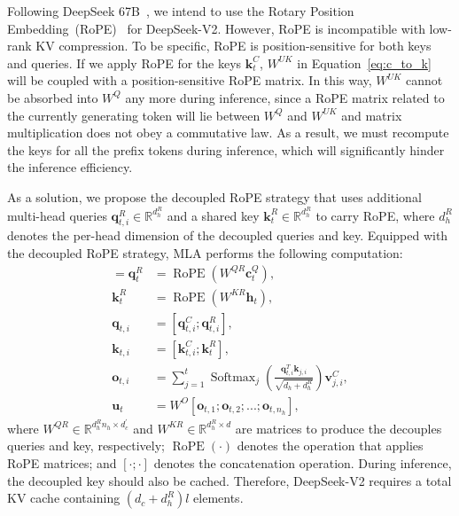 \documentclass[11pt, a4paper, logo, copyright, nonumbering]{deepseek}
\newcommand{\dsvi}{DeepSeek 67B}
\newcommand{\dsvii}{DeepSeek-V2}
\newcommand{\dsattn}{MLA}
\begin{document}
\begin{CJK*}{UTF8}{gbsn}
Following \dsvi{}~\citep{deepseek1}, we intend to use the Rotary Position Embedding~(RoPE)~\citep{su2024roformer} for \dsvii{}. 
However, RoPE is incompatible with low-rank KV compression. 
To be specific, RoPE is position-sensitive for both keys and queries. 
If we apply RoPE for the keys $\mathbf{k}_{t}^{C}$, $W^{UK}$ in Equation~\ref{eq:c_to_k} will be coupled with a position-sensitive RoPE matrix. 
In this way, $W^{UK}$ cannot be absorbed into $W^{Q}$ any more during inference, since a RoPE matrix related to the currently generating token will lie between $W^{Q}$ and $W^{UK}$ and matrix multiplication does not obey a commutative law. 
As a result, we must recompute the keys for all the prefix tokens during inference, which will significantly hinder the inference efficiency. 

As a solution, we propose the decoupled RoPE strategy that uses additional multi-head queries $\mathbf{q}_{t, i}^{R} \in \mathbb{R}^{d_h^R}$ and a shared key $\mathbf{k}_{t}^{R} \in \mathbb{R}^{d_h^R}$ to carry RoPE, where $d_h^R$ denotes the per-head dimension of the decoupled queries and key. 
Equipped with the decoupled RoPE strategy, \dsattn{} performs the following computation:
\begin{align}
    [\mathbf{q}_{t, 1}^{R};\mathbf{q}_{t, 2}^{R};...;\mathbf{q}_{t, n_{h}}^{R}] = \mathbf{q}_{t}^{R} &= \operatorname{RoPE}({W^{QR}} \mathbf{c}_{t}^{Q}), \\
    \mathbf{k}_{t}^{R} &= \operatorname{RoPE}({W^{KR}} \mathbf{h}_{t}), \\
    \mathbf{q}_{t, i} &= [\mathbf{q}_{t, i}^{C}; \mathbf{q}_{t, i}^{R}], \\
    \mathbf{k}_{t, i} &= [\mathbf{k}_{t, i}^{C}; \mathbf{k}_{t}^{R}], \\
    \mathbf{o}_{t, i} &= \sum_{j=1}^{t} \operatorname{Softmax}_j(\frac{\mathbf{q}_{t, i}^T \mathbf{k}_{j, i}}{\sqrt{d_{h} + d_{h}^{R}}}) \mathbf{v}_{j, i}^{C}, \\ 
    \mathbf{u}_{t} &= W^{O} [\mathbf{o}_{t, 1};\mathbf{o}_{t, 2};...;\mathbf{o}_{t, n_{h}}],
\end{align}
where $W^{QR} \in \mathbb{R}^{d_h^R n_h \times d_c^{\prime}}$ and $W^{KR} \in \mathbb{R}^{d_h^R \times d}$ are matrices to produce the decouples queries and key, respectively; 
$\operatorname{RoPE}(\cdot)$ denotes the operation that applies RoPE matrices; 
and $[\cdot;\cdot]$ denotes the concatenation operation. 
During inference, the decoupled key should also be cached. 
Therefore, \dsvii{} requires a total KV cache containing $(d_{c} + d_h^R)l$ elements. 


\end{CJK*}
\end{document}
